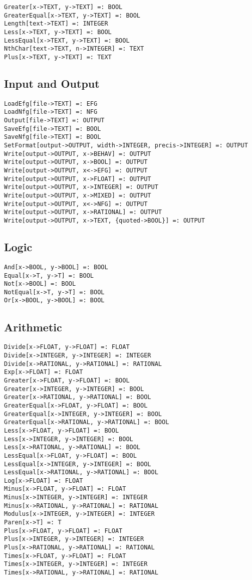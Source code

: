 \begin{verbatim}
Greater[x->TEXT, y->TEXT] =: BOOL
GreaterEqual[x->TEXT, y->TEXT] =: BOOL
Length[text->TEXT] =: INTEGER
Less[x->TEXT, y->TEXT] =: BOOL
LessEqual[x->TEXT, y->TEXT] =: BOOL
NthChar[text->TEXT, n->INTEGER] =: TEXT
Plus[x->TEXT, y->TEXT] =: TEXT
\end{verbatim}


\subsection{Input and Output}

\begin{verbatim}
LoadEfg[file->TEXT] =: EFG
LoadNfg[file->TEXT] =: NFG
Output[file->TEXT] =: OUTPUT
SaveEfg[file->TEXT] =: BOOL
SaveNfg[file->TEXT] =: BOOL
SetFormat[output->OUTPUT, width->INTEGER, precis->INTEGER] =: OUTPUT
Write[output->OUTPUT, x->BEHAV] =: OUTPUT
Write[output->OUTPUT, x->BOOL] =: OUTPUT 
Write[output->OUTPUT, x<->EFG] =: OUTPUT
Write[output->OUTPUT, x->FLOAT] =: OUTPUT
Write[output->OUTPUT, x->INTEGER] =: OUTPUT
Write[output->OUTPUT, x->MIXED] =: OUTPUT
Write[output->OUTPUT, x<->NFG] =: OUTPUT
Write[output->OUTPUT, x->RATIONAL] =: OUTPUT
Write[output->OUTPUT, x->TEXT, {quoted->BOOL}] =: OUTPUT
\end{verbatim}

\subsection{Logic}

\begin{verbatim}
And[x->BOOL, y->BOOL] =: BOOL
Equal[x->T, y->T] =: BOOL
Not[x->BOOL] =: BOOL
NotEqual[x->T, y->T] =: BOOL
Or[x->BOOL, y->BOOL] =: BOOL
\end{verbatim}

\subsection{Arithmetic}

\begin{verbatim}
Divide[x->FLOAT, y->FLOAT] =: FLOAT
Divide[x->INTEGER, y->INTEGER] =: INTEGER
Divide[x->RATIONAL, y->RATIONAL] =: RATIONAL
Exp[x->FLOAT] =: FLOAT
Greater[x->FLOAT, y->FLOAT] =: BOOL
Greater[x->INTEGER, y->INTEGER] =: BOOL
Greater[x->RATIONAL, y->RATIONAL] =: BOOL
GreaterEqual[x->FLOAT, y->FLOAT] =: BOOL
GreaterEqual[x->INTEGER, y->INTEGER] =: BOOL
GreaterEqual[x->RATIONAL, y->RATIONAL] =: BOOL
Less[x->FLOAT, y->FLOAT] =: BOOL
Less[x->INTEGER, y->INTEGER] =: BOOL
Less[x->RATIONAL, y->RATIONAL] =: BOOL
LessEqual[x->FLOAT, y->FLOAT] =: BOOL
LessEqual[x->INTEGER, y->INTEGER] =: BOOL
LessEqual[x->RATIONAL, y->RATIONAL] =: BOOL
Log[x->FLOAT] =: FLOAT
Minus[x->FLOAT, y->FLOAT] =: FLOAT
Minus[x->INTEGER, y->INTEGER] =: INTEGER
Minus[x->RATIONAL, y->RATIONAL] =: RATIONAL
Modulus[x->INTEGER, y->INTEGER] =: INTEGER
Paren[x->T] =: T
Plus[x->FLOAT, y->FLOAT] =: FLOAT
Plus[x->INTEGER, y->INTEGER] =: INTEGER
Plus[x->RATIONAL, y->RATIONAL] =: RATIONAL
Times[x->FLOAT, y->FLOAT] =: FLOAT
Times[x->INTEGER, y->INTEGER] =: INTEGER
Times[x->RATIONAL, y->RATIONAL] =: RATIONAL
\end{verbatim}

